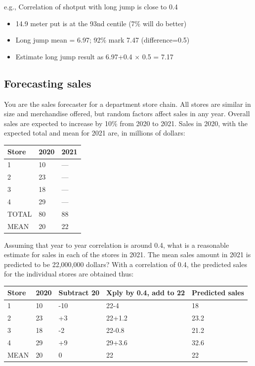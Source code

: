 \documentclass[
  10pt,
  b5paper]{book}
\providecommand{\tightlist}{%
  \setlength{\itemsep}{0pt}\setlength{\parskip}{0pt}}
\begin{document}
e.g., Correlation of shotput with long jump is close to 0.4

\begin{itemize}
\tightlist
\item
  14.9 meter put is at the 93nd centile (7\% will do better)
\item
  Long jump mean = 6.97; 92\% mark 7.47 (difference=0.5)
\item
  Estimate long jump result as 6.97+0.4 \(\times\) 0.5 = 7.17
\end{itemize}

\hypertarget{forecasting-sales}{%
\subsection*{Forecasting sales}\label{forecasting-sales}}

You are the sales forecaster for a department store chain.
All stores are similar in size and merchandise offered,
but random factors affect sales in any year. Overall sales
are expected to increase by 10\% from 2020 to 2021. Sales
in 2020, with the expected total and mean for 2021 are,
in millions of dollars:

\begin{longtable}[]{@{}lll@{}}
\toprule
Store & 2020 & 2021 \\
\midrule
\endhead
1 & 10 & --- \\
2 & 23 & --- \\
3 & 18 & --- \\
4 & 29 & --- \\
TOTAL & 80 & 88 \\
MEAN & 20 & 22 \\
\bottomrule
\end{longtable}

Assuming that year to year correlation is around 0.4,
what is a reasonable estimate for sales in each of the
stores in 2021. The mean sales amount in 2021 is predicted to be 22,000,000 dollars?
With a correlation of 0.4, the predicted sales for the individual stores are
obtained thus:

\begin{longtable}[]{@{}lllll@{}}
\toprule
Store & 2020 & Subtract 20 & Xply by 0.4, add to 22 & Predicted sales \\
\midrule
\endhead
1 & 10 & -10 & 22-4 & 18 \\
2 & 23 & +3 & 22+1.2 & 23.2 \\
3 & 18 & -2 & 22-0.8 & 21.2 \\
4 & 29 & +9 & 29+3.6 & 32.6 \\
MEAN & 20 & 0 & 22 & 22 \\
\bottomrule
\end{longtable}
\end{document}
